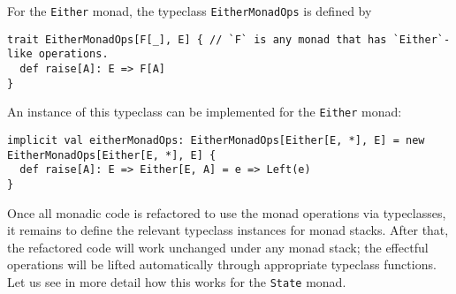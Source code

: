 For the \lstinline!Either! monad, the typeclass \lstinline!EitherMonadOps!
is defined by
\begin{lstlisting}
trait EitherMonadOps[F[_], E] { // `F` is any monad that has `Either`-like operations.
  def raise[A]: E => F[A]
}
\end{lstlisting}
An instance of this typeclass can be implemented for the \lstinline!Either!
monad:
\begin{lstlisting}
implicit val eitherMonadOps: EitherMonadOps[Either[E, *], E] = new EitherMonadOps[Either[E, *], E] {
  def raise[A]: E => Either[E, A] = e => Left(e)
}
\end{lstlisting}

Once all monadic code is refactored to use the monad operations via
typeclasses, it remains to define the relevant typeclass instances
for monad stacks. After that, the refactored code will work unchanged
under any monad stack; the effectful operations will be lifted automatically
through appropriate typeclass functions. Let us see in more detail
how this works for the \lstinline!State! monad.

